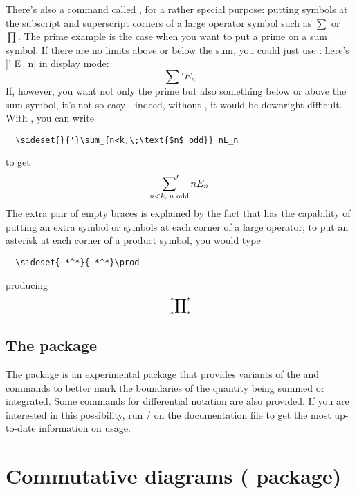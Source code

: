 \documentclass[leqno,titlepage,openany]{amsldoc}
\begin{document}
There's also a command called , for a rather special
purpose: putting symbols at the subscript and
superscript corners of a
large operator symbol such as $\sum$ or $\prod$. The prime example is
the case when you want to put a prime on a sum symbol. If there are no
limits above or below the sum, you could just use : here's
|\sum\nolimits' E_n| in display mode:
\begin{equation}
\sum\nolimits' E_n
\end{equation}
If, however, you want not only the prime but also something below or
above the sum symbol, it's not so easy---indeed, without ,
it would be downright difficult. With , you can write
\begin{verbatim}
  \sideset{}{'}\sum_{n<k,\;\text{$n$ odd}} nE_n
\end{verbatim}
to get
\begin{equation}
\sideset{}{'}\sum_{n<k,\;\text{$n$ odd}} nE_n
\end{equation}
The extra pair of empty braces is explained by the fact that
 has the capability of putting an extra symbol or symbols at
each corner of a large operator; to put an asterisk at each corner of a
product symbol, you would type
\begin{verbatim}
  \sideset{_*^*}{_*^*}\prod
\end{verbatim}
producing
\begin{equation}
\sideset{_*^*}{_*^*}\prod
\end{equation}

\section{The  package}

The  package is an experimental package that provides
variants of the  and 
commands to better mark the boundaries of the quantity being summed or
integrated. Some commands for differential notation are also provided. If you are interested in this possibility,
run \latex/ on the documentation file  to get the most
up-to-date information on usage.

\chapter{Commutative diagrams ( package)}\label{s:commdiag}
\end{document}
